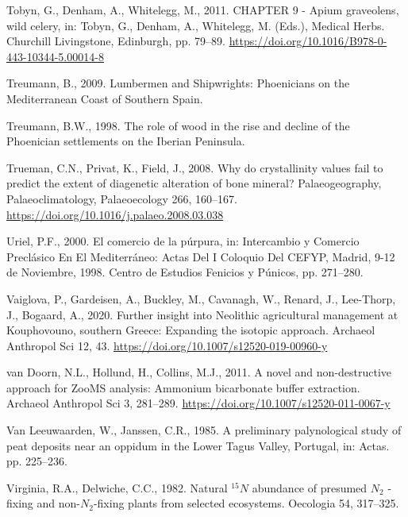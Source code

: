 \documentclass[3p]{elsarticle} %
\newlength{\cslhangindent}
\newlength{\cslentryspacingunit} %
\newenvironment{CSLReferences}[2] %
 {%
  \setlength{\parindent}{0pt}
  \ifodd #1
  \let\oldpar\par
  \def\par{\hangindent=\cslhangindent\oldpar}
  \fi
  \setlength{\parskip}{#2\cslentryspacingunit}
 }%
 {}
\begin{document}
\begin{CSLReferences}{1}{0}
\leavevmode{}%
Tobyn, G., Denham, A., Whitelegg, M., 2011. {CHAPTER} 9 - {Apium} graveolens, wild celery, in: Tobyn, G., Denham, A., Whitelegg, M. (Eds.), Medical {Herbs}. {Churchill Livingstone}, {Edinburgh}, pp. 79--89. \url{https://doi.org/10.1016/B978-0-443-10344-5.00014-8}

\leavevmode{}%
Treumann, B., 2009. Lumbermen and {Shipwrights}: {Phoenicians} on the {Mediterranean Coast} of {Southern Spain}.

\leavevmode{}%
Treumann, B.W., 1998. The role of wood in the rise and decline of the {Phoenician} settlements on the {Iberian Peninsula}.

\leavevmode{}%
Trueman, C.N., Privat, K., Field, J., 2008. Why do crystallinity values fail to predict the extent of diagenetic alteration of bone mineral? Palaeogeography, Palaeoclimatology, Palaeoecology 266, 160--167. \url{https://doi.org/10.1016/j.palaeo.2008.03.038}

\leavevmode{}%
Uriel, P.F., 2000. El comercio de la púrpura, in: Intercambio y Comercio Preclásico En El {Mediterráneo}: Actas Del {I} Coloquio Del {CEFYP}, {Madrid}, 9-12 de Noviembre, 1998. {Centro de Estudios Fenicios y Púnicos}, pp. 271--280.

\leavevmode{}%
Vaiglova, P., Gardeisen, A., Buckley, M., Cavanagh, W., Renard, J., Lee-Thorp, J., Bogaard, A., 2020. Further insight into {Neolithic} agricultural management at {Kouphovouno}, southern {Greece}: Expanding the isotopic approach. Archaeol Anthropol Sci 12, 43. \url{https://doi.org/10.1007/s12520-019-00960-y}

\leavevmode{}%
van Doorn, N.L., Hollund, H., Collins, M.J., 2011. A novel and non-destructive approach for {ZooMS} analysis: Ammonium bicarbonate buffer extraction. Archaeol Anthropol Sci 3, 281--289. \url{https://doi.org/10.1007/s12520-011-0067-y}

\leavevmode{}%
Van Leeuwaarden, W., Janssen, C.R., 1985. A preliminary palynological study of peat deposits near an oppidum in the {Lower Tagus Valley}, {Portugal}, in: Actas. pp. 225--236.

\leavevmode{}%
Virginia, R.A., Delwiche, C.C., 1982. Natural \(^{15}N\) abundance of presumed \(N_{2}\) -fixing and non-\(N_{2}\)-fixing plants from selected ecosystems. Oecologia 54, 317--325.


\end{CSLReferences}
\end{document}
